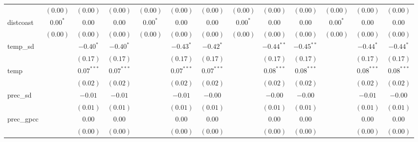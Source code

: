 \begin{sidewaystable}
\begin{center}
{\begin{tabular}{l c c c c c c c c c c c c}
                    & $(0.00)$      & $(0.00)$        & $(0.00)$        & $(0.00)$      & $(0.00)$        & $(0.00)$     & $(0.00)$      & $(0.00)$     & $(0.00)$     & $(0.00)$      & $(0.00)$     & $(0.00)$     \\
distcoast           & $0.00^{*}$    & $0.00$          & $0.00$          & $0.00^{*}$    & $0.00$          & $0.00$       & $0.00^{*}$    & $0.00$       & $0.00$       & $0.00^{*}$    & $0.00$       & $0.00$       \\
                    & $(0.00)$      & $(0.00)$        & $(0.00)$        & $(0.00)$      & $(0.00)$        & $(0.00)$     & $(0.00)$      & $(0.00)$     & $(0.00)$     & $(0.00)$      & $(0.00)$     & $(0.00)$     \\
temp\_sd            &               & $-0.40^{*}$     & $-0.40^{*}$     &               & $-0.43^{*}$     & $-0.42^{*}$  &               & $-0.44^{**}$ & $-0.45^{**}$ &               & $-0.44^{*}$  & $-0.44^{*}$  \\
                    &               & $(0.17)$        & $(0.17)$        &               & $(0.17)$        & $(0.17)$     &               & $(0.17)$     & $(0.17)$     &               & $(0.17)$     & $(0.17)$     \\
temp                &               & $0.07^{***}$    & $0.07^{***}$    &               & $0.07^{***}$    & $0.07^{***}$ &               & $0.08^{***}$ & $0.08^{***}$ &               & $0.08^{***}$ & $0.08^{***}$ \\
                    &               & $(0.02)$        & $(0.02)$        &               & $(0.02)$        & $(0.02)$     &               & $(0.02)$     & $(0.02)$     &               & $(0.02)$     & $(0.02)$     \\
prec\_sd            &               & $-0.01$         & $-0.01$         &               & $-0.01$         & $-0.00$      &               & $-0.00$      & $-0.00$      &               & $-0.01$      & $-0.00$      \\
                    &               & $(0.01)$        & $(0.01)$        &               & $(0.01)$        & $(0.01)$     &               & $(0.01)$     & $(0.01)$     &               & $(0.01)$     & $(0.01)$     \\
prec\_gpcc          &               & $0.00$          & $0.00$          &               & $0.00$          & $0.00$       &               & $0.00$       & $0.00$       &               & $0.00$       & $0.00$       \\
                    &               & $(0.00)$        & $(0.00)$        &               & $(0.00)$        & $(0.00)$     &               & $(0.00)$     & $(0.00)$     &               & $(0.00)$     & $(0.00)$     \\

\end{tabular}}
\end{center}
\end{sidewaystable}
